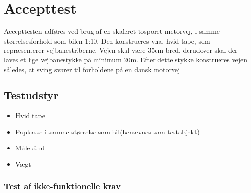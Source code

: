 \chapter{Accepttest}

Accepttesten udføres ved brug af en skaleret tosporet motorvej, i samme størrelsesforhold som bilen 1:10. Den konstrueres vha. hvid tape, som repræsenterer vejbanestriberne. Vejen skal være 35cm bred, derudover skal der laves et lige vejbanestykke på minimum 20m. Efter dette stykke konstrueres vejen således, at sving svarer til forholdene på en dansk motorvej

\section{Testudstyr}
\begin{itemize}
	\item Hvid tape
	\item Papkasse i samme størrelse som bil(benævnes som testobjekt)
	\item Målebånd
	\item Vægt
\end{itemize}




\subsection{Test af ikke-funktionelle krav}

